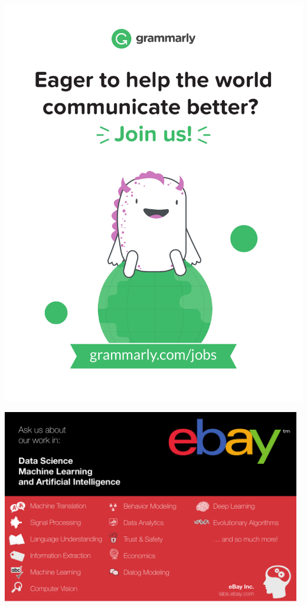 \begin{center}
\includegraphics[width=1\textwidth]{content/ads/GrammarlyAd.pdf}
\par\end{center}




\begin{center}
\includegraphics[width=0.98\textwidth]{content/ads/ebay.pdf} 
\par\end{center}%

